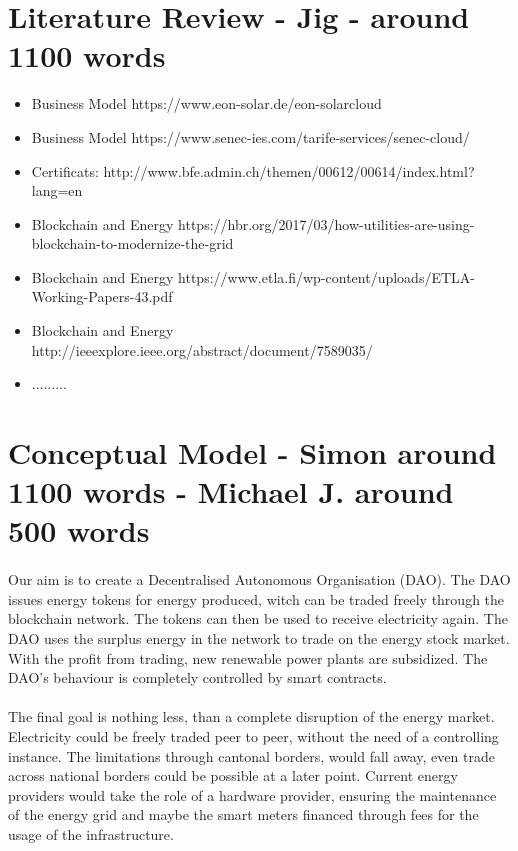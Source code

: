 \documentclass{scrartcl}
\begin{document}
	\section{Literature Review - Jig - around 1100 words}
    
    \begin{itemize}
    \item Business Model https://www.eon-solar.de/eon-solarcloud
    \item Business Model https://www.senec-ies.com/tarife-services/senec-cloud/
    \item Certificats: http://www.bfe.admin.ch/themen/00612/00614/index.html?lang=en
    \item Blockchain and Energy https://hbr.org/2017/03/how-utilities-are-using-blockchain-to-modernize-the-grid
    \item Blockchain and Energy https://www.etla.fi/wp-content/uploads/ETLA-Working-Papers-43.pdf
    \item Blockchain and Energy http://ieeexplore.ieee.org/abstract/document/7589035/
    \item .........
    \end{itemize}
	
	\section{Conceptual Model - Simon around 1100 words - Michael J. around 500 words}
	
	\paragraph{}
	Our aim is to create a Decentralised Autonomous Organisation (DAO). The DAO issues energy tokens for energy produced, witch can be traded freely through the blockchain network. The tokens can then be used to receive electricity again. The DAO uses the surplus energy in the network to trade on the energy stock market. With the profit from trading, new renewable power plants are subsidized. The DAO's behaviour is completely controlled by smart contracts.
	
	\paragraph{}
	The final goal is nothing less, than a complete disruption of the energy market. Electricity could be freely traded peer to peer, without the need of a controlling instance. The limitations through cantonal borders, would fall away, even trade across national borders could be possible at a later point. Current energy providers would take the role of a hardware provider, ensuring the maintenance of the energy grid and maybe the smart meters financed through fees for the usage of the infrastructure. 
	
\end{document}
